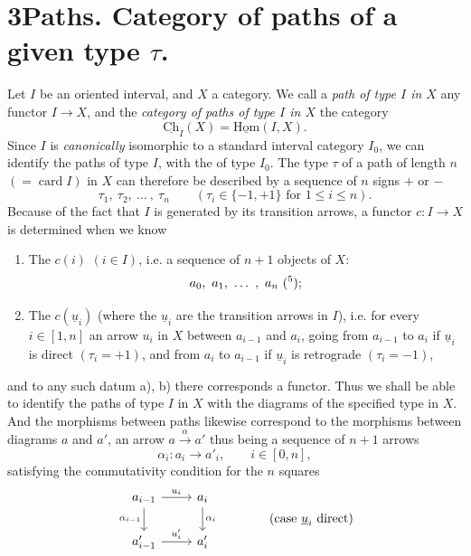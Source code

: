 \documentclass[11pt]{article}
\newcommand{\printedpage}[1]{\marginpar{\footnotesize p.~#1}}
\newcommand{\msp}[1]{\marginpar{\footnotesize [#1]}}
\newcommand{\Ch}{\underline{\mathrm{Ch}}}
\newcommand{\uHom}{\underline{\mathrm{Hom}}}
\begin{document}
\printedpage{9}

\msp{page 13}

\section*{3\quad Paths. Category of paths of a given type $\tau$.}

Let $I$ be an oriented interval, and $X$ a category. We call a \textit{path of type $I$ in $X$} any functor $I \longrightarrow X$, and the \textit{category of paths of type $I$ in $X$} the category
\[
\Ch_I(X) = \uHom(I,X).
\]
Since $I$ is \textit{canonically} isomorphic to a standard interval category $I_0$, we can identify the paths of type $I$, with the of type $I_0$. The type $\tau$ of a path of length $n$ $(= \operatorname{card} I)$ in $X$ can therefore be described by a sequence of $n$ signs $+$ or $-$ %
\[
\tau_1,\ \tau_2,\ \dots\ ,\ \tau_n \qquad (\tau_i \in \{-1,+1\} \text{ for } 1 \leq i \leq n).
\]
Because of the fact that $I$ is generated by its transition arrows, a functor $c : I \longrightarrow X$ is determined when we know %

\begin{enumerate}
\item[a)] The $c(i)$ $(i \in I)$, i.e. a sequence of $n+1$ objects of $X$:
\[
a_0,\ a_1,\ \dots\ ,\ a_n\ (\text{\footnotemark[5]});
\]

\item[b)] The $c(\underline{u}_i)$ (where the $\underline{u}_i$ are the transition arrows in $I$), i.e. for every $i \in [1,n]$ an arrow $u_i$ in $X$ between $a_{i-1}$ and $a_i$, going from $a_{i-1}$ to $a_i$ if $\underline{u}_i$ is direct $(\tau_i = +1)$, and from $a_i$ to $a_{i-1}$ if $\underline{u}_i$ is retrograde $(\tau_i = -1)$,
\end{enumerate}

and to any such datum a), b) there corresponds a functor. Thus we shall be able to identify the paths of type $I$ \msp{page 14} in $X$ with the diagrams of the specified type in $X$. And the morphisms between paths likewise correspond to the morphisms between diagrams $a$ and $a'$, an arrow $a \xrightarrow{\alpha} a'$ thus being a sequence of $n+1$ arrows
\[
\alpha_i : a_i \longrightarrow a'_i, \qquad i \in [0,n],
\]
satisfying the commutativity condition for the $n$ squares
\[
\begin{tikzcd}
a_{i-1} \arrow[r, "u_i"] \arrow[d, "\alpha_{i-1}"'] & a_i \arrow[d, "\alpha_i"] \\
a'_{i-1} \arrow[r, "u'_i"] & a'_i
\end{tikzcd}
\qquad\qquad \text{(case $\underline{u}_i$ direct)}
\]
\end{document}
